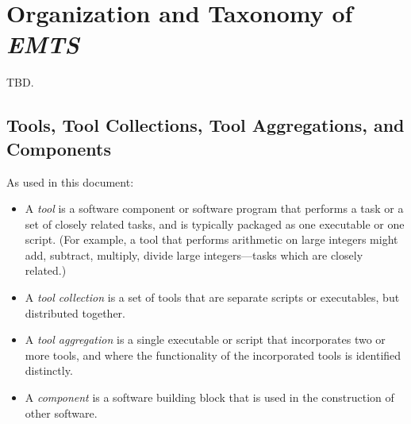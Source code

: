 \section{Organization and Taxonomy of \emph{EMTS}}
\label{ciov2:sote0}

TBD.


\subsection{Tools, Tool Collections, Tool Aggregations, and Components}
\label{ciov2:sote0:snom0}

As used in this document:

\begin{itemize}
   \item A \emph{tool} is a software component
         or software program that performs a task or a set of closely related tasks, and is
         typically packaged as one executable or one script.
         (For example, a tool that performs arithmetic on large integers might add, subtract, multiply,
         divide large integers---tasks which are closely related.)
   \item A \emph{tool collection} is a set
         of tools that are separate scripts or executables, but distributed together.
   \item A \emph{tool aggregation} is a single executable or
         script that incorporates two or more tools, and where the functionality of the
         incorporated tools is identified distinctly.
   \item A \emph{component} is a software building block that
         is used in the construction of other software. 
\end{itemize}



